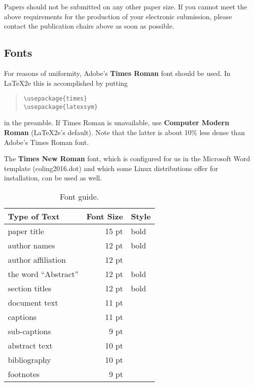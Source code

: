 \documentclass[11pt]{article}
\begin{document}
\noindent Papers should not be submitted on any other paper size.
If you cannot meet the above requirements for
the production of your electronic submission, please contact the
publication chairs above as soon as possible.


\subsection{Fonts}

For reasons of uniformity, Adobe's {\bf Times Roman} font should be
used. In \LaTeX2e{} this is accomplished by putting

\begin{quote}
\begin{verbatim}
\usepackage{times}
\usepackage{latexsym}
\end{verbatim}
\end{quote}
in the preamble. If Times Roman is unavailable, use {\bf Computer
  Modern Roman} (\LaTeX2e{}'s default).  Note that the latter is about
  10\% less dense than Adobe's Times Roman font.

The {\bf Times New Roman} font, which is configured for us in the
Microsoft Word template (coling2016.dot) and which some Linux
distributions offer for installation, can be used as well.

\begin{table}[h]
\begin{center}
\begin{tabular}{|l|rl|}
\hline \bf Type of Text & \bf Font Size & \bf Style \\ \hline
paper title & 15 pt & bold \\
author names & 12 pt & bold \\
author affiliation & 12 pt & \\
the word ``Abstract'' & 12 pt & bold \\
section titles & 12 pt & bold \\
document text & 11 pt  &\\
captions & 11 pt & \\
sub-captions & 9 pt & \\
abstract text & 10 pt & \\
bibliography & 10 pt & \\
footnotes & 9 pt & \\
\hline
\end{tabular}
\end{center}
\caption{\label{font-table} Font guide. }
\end{table}
\end{document}
